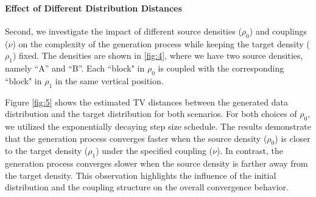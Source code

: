 \paragraph{Effect of Different Distribution Distances} Second, we investigate the impact of different source densities ($\rho_0$) and couplings ($\nu$) on the complexity of the generation process while keeping the target density ($\rho_1$) fixed. The densities are shown in \ref{fig:4}, where we have two source densities, namely ``A'' and ``B''. Each ``block" in $\rho_0$ is coupled with the corresponding ``block" in $\rho_1$ in the same vertical position.

Figure \ref{fig:5} shows the estimated TV distances between the generated data distribution and the target distribution for both scenarios. For both choices of $\rho_0$, we utilized the exponentially decaying step size schedule. The results demonstrate that the generation process converges faster when the source density ($\rho_0$) is closer to the target density ($\rho_1$) under the specified coupling ($\nu$). In contrast, the generation process converges slower when the source density is farther away from the target density. This observation highlights the influence of the initial distribution and the coupling structure on the overall convergence behavior.